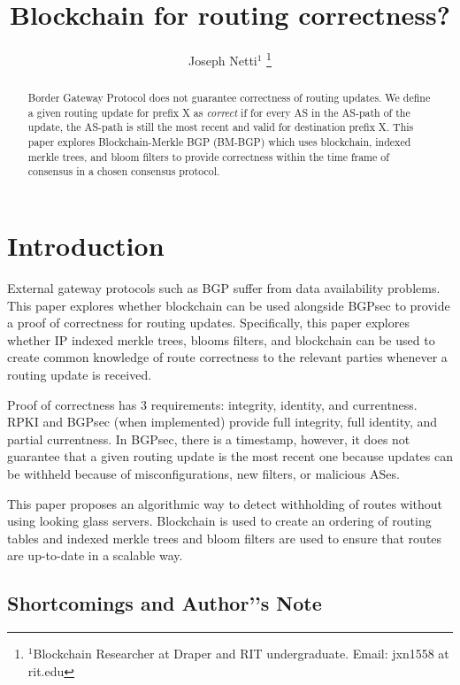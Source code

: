 \documentclass[letterpaper, 10 pt, conference]{ieeeconf}  %
\title{\LARGE \bf
Blockchain for routing correctness?
}
\author{Joseph Netti$^{1}$%
\thanks{$^{1}$Blockchain Researcher at Draper and RIT undergraduate. Email: jxn1558 at rit.edu}%
}
\begin{document}
\maketitle
\thispagestyle{empty}
\pagestyle{empty}


\begin{abstract}
Border Gateway Protocol does not guarantee correctness of routing updates. We define a given routing update for prefix X as \textit{correct} if for every AS in the AS-path of the update, the AS-path is still the most recent and valid for destination prefix X. This paper explores Blockchain-Merkle BGP (BM-BGP) which uses blockchain, indexed merkle trees, and bloom filters to provide correctness within the time frame of consensus in a chosen consensus protocol. 

\end{abstract}

\section{Introduction}
External gateway protocols such as BGP suffer from data availability problems. This paper explores whether blockchain can be used alongside BGPsec to provide a proof of correctness for routing updates. Specifically, this paper explores whether IP indexed merkle trees, blooms filters, and blockchain can be used to create common knowledge of route correctness to the relevant parties whenever a routing update is received. 

Proof of correctness has 3 requirements: integrity, identity, and currentness. RPKI and BGPsec (when implemented) provide full integrity, full identity, and partial currentness. In BGPsec, there is a timestamp, however, it does not guarantee that a given routing update is the most recent one because updates can be withheld because of misconfigurations, new filters, or malicious ASes. 

This paper proposes an algorithmic way to detect withholding of routes without using looking glass servers. Blockchain is used to create an ordering of routing tables and indexed merkle trees and bloom filters are used to ensure that routes are up-to-date in a scalable way. 


\subsection{Shortcomings and Author’'s Note}
\end{document}
